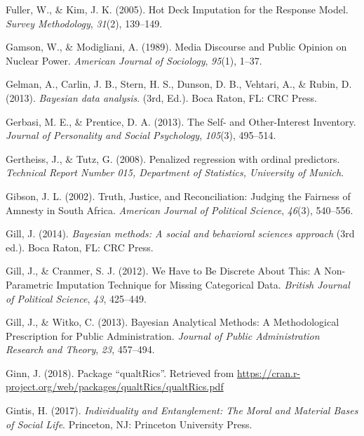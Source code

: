 \documentclass[12pt,econ]{sources/authesis}
\begin{document}
\leavevmode\hypertarget{ref-fuller_2005_deck}{}%
Fuller, W., \& Kim, J. K. (2005). Hot Deck Imputation for the Response Model. \emph{Survey Methodology}, \emph{31}(2), 139--149.

\leavevmode\hypertarget{ref-gamson_media_1989}{}%
Gamson, W., \& Modigliani, A. (1989). Media Discourse and Public Opinion on Nuclear Power. \emph{American Journal of Sociology}, \emph{95}(1), 1--37.

\leavevmode\hypertarget{ref-gelman_2013_bayesian}{}%
Gelman, A., Carlin, J. B., Stern, H. S., Dunson, D. B., Vehtari, A., \& Rubin, D. (2013). \emph{Bayesian data analysis}. (3rd, Ed.). Boca Raton, FL: CRC Press.

\leavevmode\hypertarget{ref-gerbasi_2013_self}{}%
Gerbasi, M. E., \& Prentice, D. A. (2013). The Self- and Other-Interest Inventory. \emph{Journal of Personality and Social Psychology}, \emph{105}(3), 495--514.

\leavevmode\hypertarget{ref-gertheiss_2008_penalized}{}%
Gertheiss, J., \& Tutz, G. (2008). Penalized regression with ordinal predictors. \emph{Technical Report Number 015, Department of Statistics, University of Munich}.

\leavevmode\hypertarget{ref-gibson_2002_truth}{}%
Gibson, J. L. (2002). Truth, Justice, and Reconciliation: Judging the Fairness of Amnesty in South Africa. \emph{American Journal of Political Science}, \emph{46}(3), 540--556.

\leavevmode\hypertarget{ref-gill_2014_bayesian}{}%
Gill, J. (2014). \emph{Bayesian methods: A social and behavioral sciences approach} (3rd ed.). Boca Raton, FL: CRC Press.

\leavevmode\hypertarget{ref-gill_2012_have}{}%
Gill, J., \& Cranmer, S. J. (2012). We Have to Be Discrete About This: A Non-Parametric Imputation Technique for Missing Categorical Data. \emph{British Journal of Political Science}, \emph{43}, 425--449.

\leavevmode\hypertarget{ref-gill_2013_bayesian}{}%
Gill, J., \& Witko, C. (2013). Bayesian Analytical Methods: A Methodological Prescription for Public Administration. \emph{Journal of Public Administration Research and Theory}, \emph{23}, 457--494.

\leavevmode\hypertarget{ref-ginn_2018_package}{}%
Ginn, J. (2018). Package ``qualtRics''. Retrieved from \url{https://cran.r-project.org/web/packages/qualtRics/qualtRics.pdf}

\leavevmode\hypertarget{ref-gintis_2017_individuality}{}%
Gintis, H. (2017). \emph{Individuality and Entanglement: The Moral and Material Bases of Social Life}. Princeton, NJ: Princeton University Press.
\end{document}
